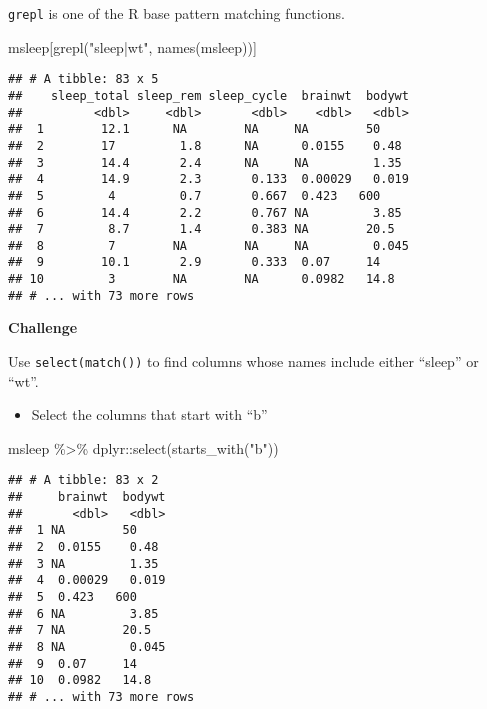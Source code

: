 \documentclass[
]{book}
\newenvironment{Shaded}{\begin{snugshade}}{\end{snugshade}}
\newcommand{\FunctionTok}[1]{\textcolor[rgb]{0.00,0.00,0.00}{#1}}
\newcommand{\NormalTok}[1]{#1}
\newcommand{\SpecialCharTok}[1]{\textcolor[rgb]{0.00,0.00,0.00}{#1}}
\newcommand{\StringTok}[1]{\textcolor[rgb]{0.31,0.60,0.02}{#1}}
\providecommand{\tightlist}{%
  \setlength{\itemsep}{0pt}\setlength{\parskip}{0pt}}
\begin{document}
\texttt{grepl} is one of the R base pattern matching functions.

\begin{Shaded}
\begin{Highlighting}[]
\NormalTok{msleep[}\FunctionTok{grepl}\NormalTok{(}\StringTok{"sleep|wt"}\NormalTok{, }\FunctionTok{names}\NormalTok{(msleep))]}
\end{Highlighting}
\end{Shaded}

\begin{verbatim}
## # A tibble: 83 x 5
##    sleep_total sleep_rem sleep_cycle  brainwt  bodywt
##          <dbl>     <dbl>       <dbl>    <dbl>   <dbl>
##  1        12.1      NA        NA     NA        50    
##  2        17         1.8      NA      0.0155    0.48 
##  3        14.4       2.4      NA     NA         1.35 
##  4        14.9       2.3       0.133  0.00029   0.019
##  5         4         0.7       0.667  0.423   600    
##  6        14.4       2.2       0.767 NA         3.85 
##  7         8.7       1.4       0.383 NA        20.5  
##  8         7        NA        NA     NA         0.045
##  9        10.1       2.9       0.333  0.07     14    
## 10         3        NA        NA      0.0982   14.8  
## # ... with 73 more rows
\end{verbatim}

\textbf{Challenge}

Use \texttt{select(match())} to find columns whose names include either ``sleep'' or ``wt''.

\begin{itemize}
\tightlist
\item
  Select the columns that start with ``b''
\end{itemize}

\begin{Shaded}
\begin{Highlighting}[]
\NormalTok{msleep }\SpecialCharTok{\%\textgreater{}\%}
\NormalTok{  dplyr}\SpecialCharTok{::}\FunctionTok{select}\NormalTok{(}\FunctionTok{starts\_with}\NormalTok{(}\StringTok{"b"}\NormalTok{))}
\end{Highlighting}
\end{Shaded}

\begin{verbatim}
## # A tibble: 83 x 2
##     brainwt  bodywt
##       <dbl>   <dbl>
##  1 NA        50    
##  2  0.0155    0.48 
##  3 NA         1.35 
##  4  0.00029   0.019
##  5  0.423   600    
##  6 NA         3.85 
##  7 NA        20.5  
##  8 NA         0.045
##  9  0.07     14    
## 10  0.0982   14.8  
## # ... with 73 more rows
\end{verbatim}
\end{document}

